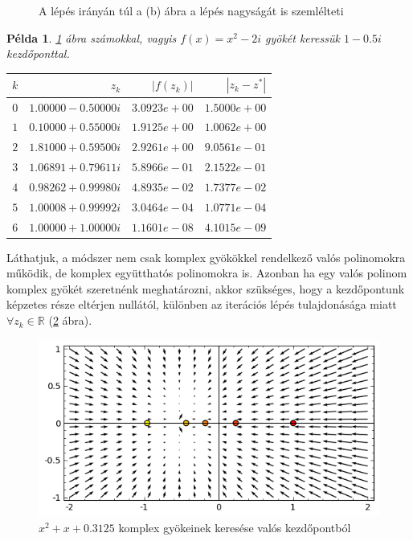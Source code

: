\documentclass[a4paper,12pt]{report}
\newtheorem{Pl}[Tet]{Példa}
\begin{document}
\begin{figure}[htp!]
           	 	\caption{A lépés irányán túl a (b) ábra a lépés nagyságát is szemlélteti} \label{k4}
           	\end{figure}
            \begin{Pl}
				\ref{k4} ábra számokkal, vagyis $f(x)=x^2-2i$ gyökét keressük $1-0.5i$ kezdőponttal.
				\begin{center}				
                    \begin{tabular}{|r|r|r|r|}
                        \hline
                        $k$ & $z_k$                & $|f(z_k)|$    & $|z_k-z^*|$  \\ \hline
                        $0$ & $1.00000 - 0.50000i$ & $3.0923e+00$  & $1.5000e+00$ \\ 
                        $1$ & $0.10000 + 0.55000i$ & $ 1.9125e+00$ & $1.0062e+00$ \\ 
                        $2$ & $1.81000 + 0.59500i$ & $2.9261e+00$  & $9.0561e-01$ \\ 
                        $3$ & $1.06891 + 0.79611i$ & $5.8966e-01$  & $2.1522e-01$ \\ 
                        $4$ & $0.98262 + 0.99980i$ & $4.8935e-02$  & $1.7377e-02$ \\ 
                        $5$ & $1.00008 + 0.99992i$ & $3.0464e-04$  & $1.0771e-04$ \\ 
                        $6$ & $1.00000 + 1.00000i$ & $1.1601e-08$  & $4.1015e-09$ \\
                        \hline
                    \end{tabular}
				\end{center}
            \end{Pl}
			Láthatjuk, a módszer nem csak komplex gyökökkel rendelkező valós polinomokra működik, de komplex együtthatós polinomokra is. Azonban ha egy valós polinom komplex gyökét szeretnénk meghatározni, akkor szükséges, hogy a kezdőpontunk képzetes része eltérjen nullától, különben az iterációs lépés tulajdonásága miatt $\forall z_k\in \mathbb{R}$ (\ref{k5} ábra).
            
            \begin{figure}[htp]
				\begin{center}
				\includegraphics[scale=0.62]{kep5.png}
				\caption{$x^2 + x + 0.3125$ komplex gyökeinek keresése valós kezdőpontból} \label{k5}
				\end{center}
			\end{figure}
\end{document}
